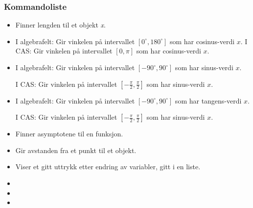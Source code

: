 \subsubsection{Kommandoliste}
\begin{itemize}
\item {}
{Finner lengden til et objekt \textit{x}.
}

\item {}
{
I algebrafelt: Gir vinkelen på intervallet $ [0^\circ, 180^\circ] $ som har cosinus-verdi $ x $. \os
I CAS: Gir vinkelen på intervallet $ [0, \pi] $ som har cosinus-verdi $ x $.
}

\item {}
{
I algebrafelt: Gir vinkelen på intervallet $ [-90^\circ, 90^\circ] $ som har sinus-verdi $ x $.\os

I CAS: Gir vinkelen på intervallet $ [-\frac{\pi}{2}, \frac{\pi}{2}] $ som har sinus-verdi $ x $.
}

\item {}
{
I algebrafelt: Gir vinkelen på intervallet $ [-90^\circ, 90^\circ] $ som har tangens-verdi $ x $.\os

I CAS: Gir vinkelen på intervallet $ [-\frac{\pi}{2}, \frac{\pi}{2}] $ som har sinus-verdi $ x $.
}

\item {}
{Finner asymptotene til en funksjon.}



\item {}
{Gir avstanden fra et punkt til et objekt.}

\item {}
{Viser et gitt uttrykk etter endring av variabler, gitt i en liste.}

\item {}

\item {}

\item {}


\end{itemize}
